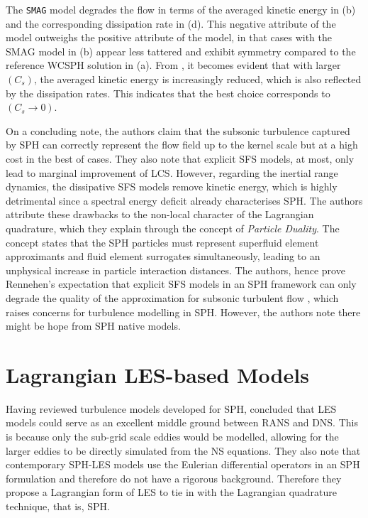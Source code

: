 The \texttt{SMAG} model degrades the flow in terms of the averaged kinetic energy in  (b) and the corresponding dissipation rate in  (d). This negative attribute of the model outweighs the positive attribute of the model, in that cases with the SMAG model in  (b) appear less tattered and exhibit symmetry compared to the reference WCSPH solution in  (a).
From , it becomes evident that with larger $(C_s)$, the averaged kinetic energy is increasingly reduced, which is also reflected by the dissipation rates. This indicates that the best choice corresponds to $(C_s \rightarrow 0)$.

On a concluding note, the authors claim that the subsonic turbulence captured by SPH can correctly represent the flow field up to the kernel scale but at a high cost in the best of cases. They also note that explicit SFS
models, at most, only lead to marginal improvement of LCS. However, regarding the inertial range dynamics, the dissipative SFS models remove kinetic energy, which is highly detrimental since a spectral energy deficit already characterises SPH. The authors attribute these drawbacks to the non-local character of the Lagrangian quadrature, which they explain through the concept of \textit{Particle Duality}. The concept states that the SPH particles must represent superfluid element approximants and fluid element surrogates simultaneously, leading to an unphysical increase in particle interaction distances. The authors, hence
prove Rennehen’s expectation that explicit SFS models in an SPH framework can only degrade the quality of the approximation for subsonic turbulent flow \parencite{rennehan2021mixing}, which raises concerns for turbulence modelling in SPH. However, the authors note there might be hope from SPH native models.

\section{Lagrangian LES-based Models}
\label{sec:lagrangian-les-based-model}
Having reviewed turbulence models developed for SPH, \cite{DiMascio2017} concluded that LES models could serve as an excellent middle ground between RANS and DNS. This is because only the sub-grid scale eddies would be modelled, allowing for the larger eddies to be directly simulated from the NS equations. They also note that contemporary SPH-LES models use the Eulerian differential operators in an SPH formulation and therefore do not have a rigorous background. Therefore they propose a Lagrangian form of LES to tie in with the Lagrangian quadrature technique, that is, SPH. 

